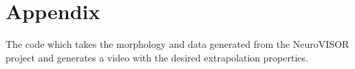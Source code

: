 
\section{Appendix}

The code\cite{neuropy} which takes the morphology and data generated from the NeuroVISOR\cite{neuroVISOR} project and generates a video with the desired extrapolation properties.

\inputminted{python}{./code/extrapolateFromData.py}
